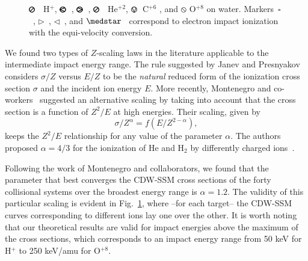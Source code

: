 \documentclass[10pt,showpacs,showkeys,twocolumn]{revtex4-1}
\begin{document}
\begin{figure}[!htb]
{{\fontsize{11}{20}\color{red}$\pmb{\varoslash}$}~\cite{toburen80} H$^+$,
{\fontsize{11}{20}\color{ForestGreen}$\pmb{\varolessthan}$}~\cite{Ohsawa05},
{\fontsize{11}{20}\color{ForestGreen}$\pmb{\varogreaterthan}$}~\cite{Rudd85},
{\fontsize{11}{20}\color{ForestGreen}$\pmb{\varoslash}$}~\cite{toburen80} He$^{+2}$,
{\fontsize{11}{20}\color{Purple}$\pmb{\ovee}$}~C$^{+6}$ \cite{DalCappello2009,Bhattacharjee17}, and 
{\fontsize{11}{20}\color{BurntOrange}$\pmb{\obslash}$}
O$^{+8}$ \cite{Tribedi_O_water} on water.
Markers~$\square$~\cite{rahman2016}, 
$\rhd$~\cite{bug2017}, 
$\lhd$~\cite{wolf2019}, and 
$\medstar$~\cite{fuss2009} correspond to electron impact ionization with 
the equi-velocity conversion.}
\label{fig:zreduced}
\end{figure} 

We found two types of $Z$-scaling laws in the literature applicable 
to the intermediate impact energy range. The rule suggested by Janev 
and Presnyakov~\cite{janev1980} 
considers $\sigma/Z$ versus $E/Z$ to be the \textit{natural} reduced  
form of the ionization cross section $\sigma$ and the incident ion energy $E$. More recently, Montenegro and co-workers~\cite{dubois13,
montenegro_pra13} suggested an alternative scaling by taking into 
account that the cross section is a function of $Z^2/E$ at high 
energies. Their scaling, given by 
\begin{equation}
 \sigma/Z^{\alpha}=f(E/Z^{2-\alpha}),
\label{eq:Montenegro}
\end{equation}
keeps the $Z^2/E$ relationship for any value of the parameter 
$\alpha$. The authors proposed $\alpha=4/3$ for the ionization of He and 
H$_2$ by differently charged ions~\cite{dubois13}. 
 
Following the work of Montenegro and collaborators, we found that the 
parameter that best converges the CDW-SSM cross sections of the forty 
collisional systems over the broadest energy range is $\alpha=1.2$. 
The validity of this particular scaling is evident in 
Fig.~\ref{fig:zreduced}, where --for each target-- the CDW-SSM curves
corresponding to different ions lay one over the other. 
It is worth noting that our theoretical results are valid for impact
energies above the maximum of the cross sections, which corresponds to 
an impact energy range from 50 keV for H$^+$ to 250 keV/amu for 
O$^{+8}$.
\end{document}
